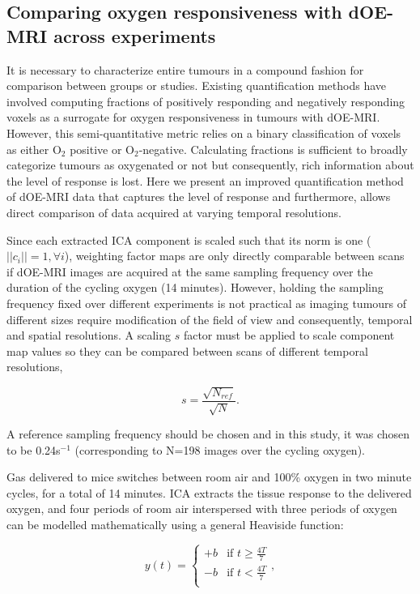 \subsection{Comparing oxygen responsiveness with \acs{dOE-MRI} across experiments}
\label{sec:correctionfactor}
It is necessary to characterize entire tumours in a compound fashion for comparison between groups or studies. 
Existing quantification methods have involved computing fractions of positively responding and negatively responding voxels as a surrogate for oxygen responsiveness in tumours with \acs{dOE-MRI}.
However, this semi-quantitative metric relies on a binary classification of voxels as either O$_2$ positive or O$_2$-negative.
Calculating fractions is sufficient to broadly categorize tumours as oxygenated or not but consequently, rich information about the level of response is lost.
Here we present an improved quantification method of \acs{dOE-MRI} data that captures the level of response and furthermore, allows direct comparison of data acquired at varying temporal resolutions.

Since each extracted \acs{ICA} component is scaled such that its norm is one ($||c_i||=1, \forall i $), weighting factor maps are only directly comparable between scans if \acs{dOE-MRI} images are acquired at the same sampling frequency over the duration of the cycling oxygen (14 minutes).
However, holding the sampling frequency fixed over different experiments is not practical as imaging tumours of different sizes require modification of the field of view and consequently, temporal and spatial resolutions.
A scaling $s$ factor must be applied to scale component map values so they can be compared between scans of different temporal resolutions,

\begin{equation}
s = \frac{\sqrt{N_{ref}}}{\sqrt{N}}.
\label{correctionfactor}
\end{equation}

A reference sampling frequency should be chosen and in this study, it was chosen to be 0.24s$^{-1}$ (corresponding to N=198 images over the cycling oxygen).

Gas delivered to mice switches between room air and 100\% oxygen in two minute cycles, for a total of 14 minutes.
\acs{ICA} extracts the tissue response to the delivered oxygen, and four periods of room air interspersed with three periods of oxygen can be modelled mathematically using a general Heaviside function:

\begin{equation}
y(t) =
  \begin{cases}
                                   +b & \text{if $t\geq \frac{4T}{7}$} \\
                                   -b & \text{if $t< \frac{4T}{7}$} \\
  \end{cases},
\end{equation}

